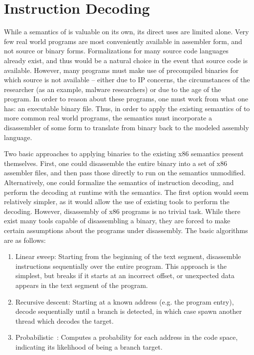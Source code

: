 \section{Instruction Decoding}

While a semantics of  is valuable on its own, its direct uses are limited alone.  Very few real world programs are most conveniently available in assembler form, and not source or binary forms.   Formalizations for many source code languages already exist, and thus would be a natural choice in the event that source code is available.  However, many programs must make use of precompiled binaries for which source is not available – either due to IP concerns, the circumstances of the researcher (as an example, malware researchers) or due to the age of the program.  In order to reason about these programs, one must work from what one has: an executable binary file.  Thus, in order to apply the existing semantics of \GENISA to more common real world programs, the semantics must incorporate a disassembler of some form to translate from binary back to the modeled assembly language.

Two basic approaches to applying binaries to the existing x86 semantics present themselves.  First, one could disassemble the entire binary into a set of x86 assembler files, and then pass those directly to run on the semantics unmodified.  Alternatively, one could formalize the semantics of instruction decoding, and perform the decoding at runtime with the semantics.  The first option would seem relatively simpler, as it would allow the use of existing tools to perform the decoding.  However, disassembly of x86 programs is no trivial task.  While there exist many tools capable of disassembling a binary, they are forced to make certain assumptions about the programs under disassembly.  The basic algorithms are as follows:

\begin{enumerate}
    \item Linear sweep: Starting from the beginning of the text segment, disassemble instructions sequentially over the entire program.  This approach is the simplest, but breaks if it starts at an incorrect offset, or unexpected data appears in the text segment of the program.
    \item Recursive descent: Starting at a known address (e.g. the program entry), decode sequentially until a branch is detected, in which case spawn another thread which decodes the target.
    \item Probabilistic~\cite{Miller:2019}: Computes a probability for each address in the code space, indicating its likelihood of being a branch target. 
\end{enumerate}

